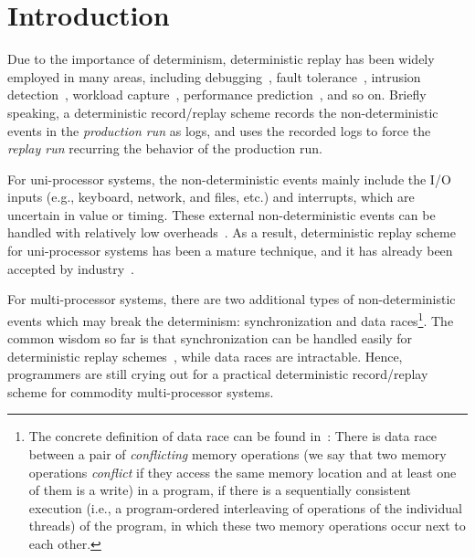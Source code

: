 \documentclass[10pt,onecolumn,letterpaper]{article}
\begin{document}
\section{Introduction}

Due to the importance of determinism, deterministic replay has been
widely employed in many areas, including
debugging~\cite{King05ATC,Tucek07SOSP}, fault
tolerance~\cite{Bressoud96TCS}, intrusion
detection~\cite{Dunlap02OSDI}, workload
capture~\cite{Narayanasamy06SIGMETRICS}, performance
prediction~\cite{Zhai10PPoPP}, and so on. Briefly speaking, a
deterministic record/replay scheme records the non-deterministic
events in the \emph{production run} as logs, and uses the recorded
logs to force the \emph{replay run} recurring the behavior of the
production run.

For uni-processor systems, the non-deterministic events mainly
include the I/O inputs (e.g., keyboard, network, and files, etc.)
and interrupts, which are uncertain in value or timing. These
external non-deterministic events can be handled with relatively low
overheads~\cite{Dunlap02OSDI,Guo08OSDI}. As a result, deterministic
replay scheme for uni-processor systems has been a mature technique,
and it has already been accepted by industry~\cite{GDB2009}.

For multi-processor systems, there are two additional types of
non-deterministic events which may break the determinism:
synchronization and data races\footnote{The concrete definition of
data race can be found in~\cite{Adve10CACM}: There is data race
between a pair of \emph{conflicting} memory operations (we say that
two memory operations \emph{conflict} if they access the same memory
location and at least one of them is a write) in a program, if there
is a sequentially consistent execution (i.e., a program-ordered
interleaving of operations of the individual threads) of the
program, in which these two memory operations occur next to each
other.}. The common wisdom so far is that synchronization can be
handled easily for deterministic replay schemes~\cite{Ronsse99TCS},
while data races are intractable. Hence, programmers are still
crying out for a practical deterministic record/replay scheme for
commodity multi-processor systems.
\end{document}
